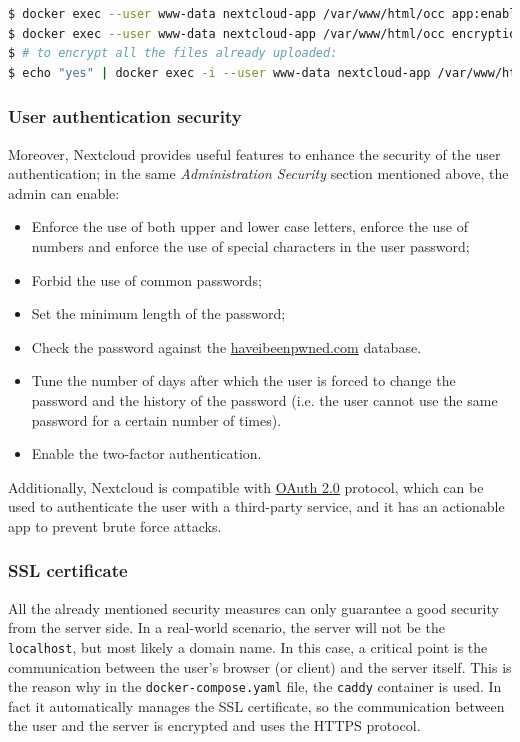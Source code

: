 \begin{lstlisting}[language=bash, basicstyle=\footnotesize]
$ docker exec --user www-data nextcloud-app /var/www/html/occ app:enable encryption
$ docker exec --user www-data nextcloud-app /var/www/html/occ encryption:enable
$ # to encrypt all the files already uploaded: 
$ echo "yes" | docker exec -i --user www-data nextcloud-app /var/www/html/occ encryption:encrypt-all
\end{lstlisting}

\subsubsection{User authentication security}
Moreover, Nextcloud provides useful features to enhance the security of the user authentication; in the same \textit{Administration Security} section mentioned above, the admin can enable: 

\begin{itemize}
    \itemsep0em
    \item Enforce the use of both upper and lower case letters, enforce the use of numbers and enforce the use of special characters in the user password;
    \item Forbid the use of common passwords;
    \item Set the minimum length of the password;
    \item Check the password against the \href{https://haveibeenpwned.com/}{haveibeenpwned.com} database.
    \item Tune the number of days after which the user is forced to change the password and the history of the password (i.e. the user cannot use the same password for a certain number of times).
    \item Enable the two-factor authentication.
\end{itemize}

Additionally, Nextcloud is compatible with  \href{https://oauth.net/2/}{OAuth 2.0} protocol, which can be used to authenticate the user with a third-party service, and it has an actionable app to prevent brute force attacks.

\subsubsection{SSL certificate}

All the already mentioned security measures can only guarantee a good security from the server side. In a real-world scenario, the server will not be the \texttt{localhost}, but most likely a domain name.
In this case, a critical point is the communication between the user's browser (or client) and the server itself. 
This is the reason why in the \texttt{docker-compose.yaml} file, the \texttt{caddy} container is used. In fact it automatically manages the SSL certificate, so the communication between the user and the server is encrypted and uses the HTTPS protocol.

